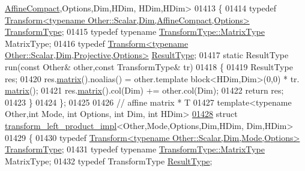 \begin{DoxyCode}
      \hyperlink{group__enums_ggaee59a86102f150923b0cac6d4ff05107aa30a06b60d218b709020972df47de2b0}{AffineCompact},Options,Dim,HDim, HDim,HDim>
01413 \{
01414   \textcolor{keyword}{typedef} \hyperlink{group___geometry___module_class_eigen_1_1_transform}{Transform<typename Other::Scalar,Dim,AffineCompact,Options>}
       \hyperlink{group___geometry___module_class_eigen_1_1_transform}{TransformType};
01415   \textcolor{keyword}{typedef} \textcolor{keyword}{typename} \hyperlink{group___core___module_class_eigen_1_1_matrix}{TransformType::MatrixType} MatrixType;
01416   \textcolor{keyword}{typedef} \hyperlink{group___geometry___module_class_eigen_1_1_transform}{Transform<typename Other::Scalar,Dim,Projective,Options>}
       \hyperlink{group___geometry___module_class_eigen_1_1_transform}{ResultType};
01417   \textcolor{keyword}{static} ResultType run(\textcolor{keyword}{const} Other& other,\textcolor{keyword}{const} TransformType& tr)
01418   \{
01419     ResultType res;
01420     res.\hyperlink{group___geometry___module_aec8168000a88a807130d41020af98d47}{matrix}().noalias() = other.template block<HDim,Dim>(0,0) * tr.
      \hyperlink{group___geometry___module_aec8168000a88a807130d41020af98d47}{matrix}();
01421     res.\hyperlink{group___geometry___module_aec8168000a88a807130d41020af98d47}{matrix}().col(Dim) += other.col(Dim);
01422     \textcolor{keywordflow}{return} res;
01423   \}
01424 \};
01425 
01426 \textcolor{comment}{// affine matrix * T}
01427 \textcolor{keyword}{template}<\textcolor{keyword}{typename} Other,\textcolor{keywordtype}{int} Mode, \textcolor{keywordtype}{int} Options, \textcolor{keywordtype}{int} Dim, \textcolor{keywordtype}{int} HDim>
\hyperlink{struct_eigen_1_1internal_1_1transform__left__product__impl_3_01_other_00_01_mode_00_01_options_037bfaa634250d504931892f5ae22fc66}{01428} \textcolor{keyword}{struct }\hyperlink{struct_eigen_1_1internal_1_1transform__left__product__impl}{transform\_left\_product\_impl}<Other,Mode,Options,Dim,HDim, Dim,HDim>
01429 \{
01430   \textcolor{keyword}{typedef} \hyperlink{group___geometry___module_class_eigen_1_1_transform}{Transform<typename Other::Scalar,Dim,Mode,Options>}
       \hyperlink{group___geometry___module_class_eigen_1_1_transform}{TransformType};
01431   \textcolor{keyword}{typedef} \textcolor{keyword}{typename} \hyperlink{group___core___module_class_eigen_1_1_matrix}{TransformType::MatrixType} MatrixType;
01432   \textcolor{keyword}{typedef} TransformType \hyperlink{group___geometry___module_class_eigen_1_1_transform}{ResultType};

\end{DoxyCode}
